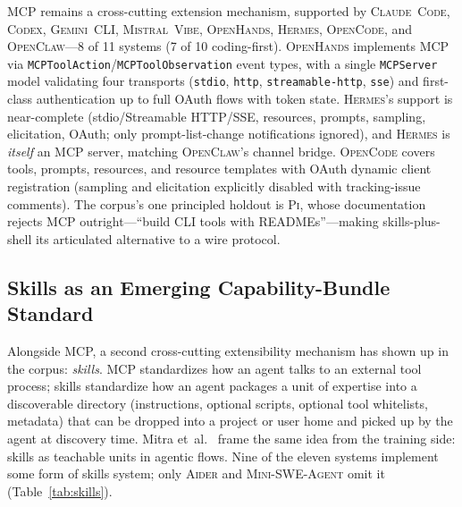 \documentclass[11pt,a4paper]{article}
\newcommand{\clcode}{\textsc{Claude~Code}\xspace}
\newcommand{\cdx}{\textsc{Codex}\xspace}
\newcommand{\oh}{\textsc{OpenHands}\xspace}
\newcommand{\adr}{\textsc{Aider}\xspace}
\newcommand{\mswe}{\textsc{Mini-SWE-Agent}\xspace}
\newcommand{\ocl}{\textsc{OpenClaw}\xspace}
\newcommand{\vibe}{\textsc{Mistral~Vibe}\xspace}
\newcommand{\gemini}{\textsc{Gemini~CLI}\xspace}
\newcommand{\hrm}{\textsc{Hermes}\xspace}
\newcommand{\pib}{\textsc{Pi}\xspace}
\newcommand{\ocd}{\textsc{OpenCode}\xspace}
\begin{document}
MCP remains a cross-cutting extension mechanism, supported by \clcode{}, \cdx{}, \gemini{}, \vibe{}, \oh{}, \hrm{}, \ocd{}, and \ocl{}---8 of 11 systems (7 of 10 coding-first).
\oh{} implements MCP via \texttt{MCPToolAction}/\texttt{MCPToolObservation} event types, with a single \texttt{MCPServer} model validating four transports (\texttt{stdio}, \texttt{http}, \texttt{streamable-http}, \texttt{sse}) and first-class authentication up to full OAuth flows with token state.
\hrm{}'s support is near-complete (stdio/Streamable HTTP/SSE, resources, prompts, sampling, elicitation, OAuth; only prompt-list-change notifications ignored), and \hrm{} is \emph{itself} an MCP server, matching \ocl{}'s channel bridge.
\ocd{} covers tools, prompts, resources, and resource templates with OAuth dynamic client registration (sampling and elicitation explicitly disabled with tracking-issue comments).
The corpus's one principled holdout is \pib{}, whose documentation rejects MCP outright---``build CLI tools with READMEs''---making skills-plus-shell its articulated alternative to a wire protocol.

\subsection{Skills as an Emerging Capability-Bundle Standard}
\label{sec:skills}

Alongside MCP, a second cross-cutting extensibility mechanism has shown up in the corpus: \emph{skills}.
MCP standardizes how an agent talks to an external tool process; skills standardize how an agent packages a unit of expertise into a discoverable directory (instructions, optional scripts, optional tool whitelists, metadata) that can be dropped into a project or user home and picked up by the agent at discovery time.
Mitra et~al.~\cite{mitra2024agentinstruct} frame the same idea from the training side: skills as teachable units in agentic flows.
Nine of the eleven systems implement some form of skills system; only \adr{} and \mswe{} omit it (Table~\ref{tab:skills}).
\end{document}
